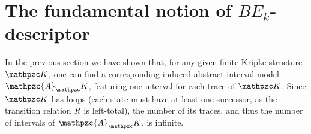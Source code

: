 





\section{The fundamental notion of $BE_k$-descriptor}\label{sec:descr}
In the previous section we have shown that, for any given finite Kripke structure $\Ku$, one can find a corresponding induced abstract interval model $\mathpzc{A}_\Ku$, featuring one interval for each trace of $\Ku$. Since $\Ku$ has loops (each state must have at least one successor, as the transition relation $\textit{R}$ is left-total), the number of its traces, and thus the number of intervals of $\mathpzc{A}_\Ku$, is infinite.

